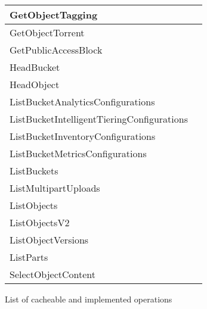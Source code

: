\begin{figure}[!hbpt]
\begin{center}
\begin{tabular}{| l | l |}
			GetObjectTagging & \xmark \\ \hline
			GetObjectTorrent & \xmark \\ \hline
			GetPublicAccessBlock & \xmark \\ \hline
			HeadBucket & \cmark \\ \hline
			HeadObject & \cmark \\ \hline
			ListBucketAnalyticsConfigurations & \xmark \\ \hline
			ListBucketIntelligentTieringConfigurations & \xmark \\ \hline
			ListBucketInventoryConfigurations & \xmark \\ \hline
			ListBucketMetricsConfigurations & \xmark \\ \hline
			ListBuckets & \cmark \\ \hline
			ListMultipartUploads & \xmark \\ \hline
			ListObjects & \cmark \\ \hline
			ListObjectsV2 & \cmark \\ \hline
			ListObjectVersions & \cmark \\ \hline
			ListParts & \xmark \\ \hline
			SelectObjectContent & \xmark \\ \hline
		\end{tabular}
	\end{center}
	\caption{List of cacheable and implemented operations}
	\label{appendix:tab:cachedops}
\end{figure}

